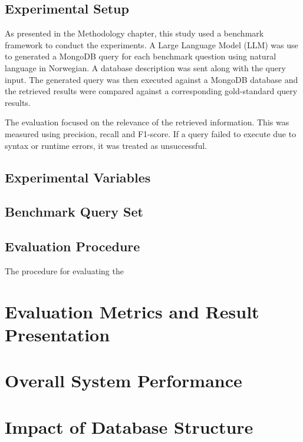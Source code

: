 \subsection{Experimental Setup}

As presented in the Methodology chapter, this study used a benchmark framework to conduct the experiments. A Large Language Model (LLM) was use to generated a MongoDB query for each benchmark question using natural language in Norwegian. A database description was sent along with the query input. The generated query was then executed against a MongoDB database and the retrieved results were compared against a corresponding gold-standard query results. 

The evaluation focused on the relevance of the retrieved information. This was measured using precision, recall and F1-score. If a query failed to execute due to syntax or runtime errors, it was treated as unsuccessful.

\subsection{Experimental Variables}




\subsection{Benchmark Query Set}

\subsection{Evaluation Procedure}

The procedure for evaluating the 

\section{Evaluation Metrics and Result Presentation}



\section{Overall System Performance}



\section{Impact of Database Structure}



